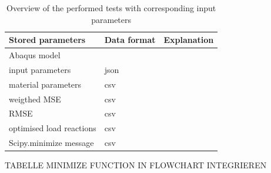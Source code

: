 \begin{table}[H]
    \centering
    \renewcommand{\arraystretch}{1.2}
    \caption{Overview of the performed tests with corresponding input parameters}
    \label{tab: testSeries}
    \begin{tabular}{L{0.3\textwidth}C{0.08\textwidth}C{0.13\textwidth}}
    \toprule
   \textbf{Stored parameters} & \textbf{Data format} & \textbf{Explanation}\\ \midrule
   Abaqus model &  & \\
   input parameters & json & \\
   material parameters & csv \\
   weigthed MSE & csv & \\
   RMSE & csv & \\
   optimised load reactions & csv & \\
   Scipy.minimize message & csv & \\

   
    \bottomrule
    \end{tabular}
    
\end{table}

TABELLE
MINIMIZE FUNCTION IN FLOWCHART INTEGRIEREN





